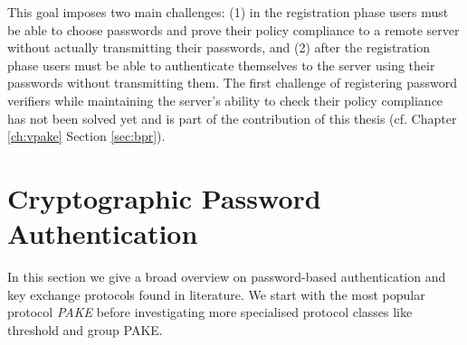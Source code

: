 This goal imposes two main challenges:
(1) in the registration phase users must be able to choose passwords and prove their policy compliance to a remote server without actually transmitting their passwords, and 
(2) after the registration phase users must be able to authenticate themselves to the server using their passwords without transmitting them.
The first challenge of registering password verifiers while maintaining the server's ability to check their policy compliance has not been solved yet and is part of the contribution of this thesis (cf. Chapter \ref{ch:vpake} Section \ref{sec:bpr}).



\section{Cryptographic Password Authentication}\label{sec:intro:pake}
In this section we give a broad overview on password-based authentication and key exchange protocols found in literature.
We start with the most popular protocol \emph{\ac{PAKE}} before investigating more specialised protocol classes like threshold and group \ac{PAKE}.

